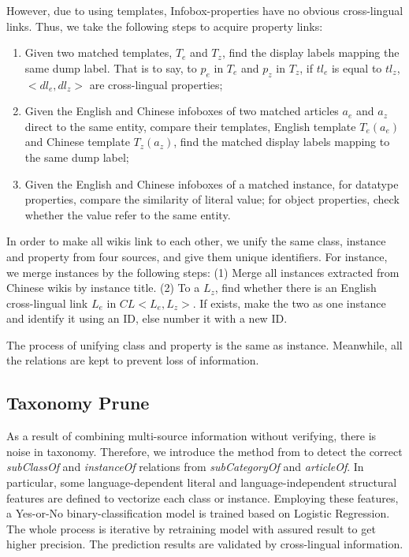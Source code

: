 \documentclass[runningheads,a4paper]{llncs}
\begin{document}
However, due to using templates, Infobox-properties have no obvious cross-lingual links. Thus, we take the following steps to acquire property links:
\begin{enumerate}
    \item Given two matched templates, $T_{e}$ and $T_{z}$, find the display labels mapping the same dump label. That is to say, to $p_{e}$ in $T_{e}$ and $p_{z}$ in $T_{z}$, if $tl_{e}$ is equal to $tl_{z}$, $<dl_{e},dl_{z}>$ are cross-lingual properties;
    \item Given the English and Chinese infoboxes of two matched articles $a_{e}$ and $a_{z}$ direct to the same entity, compare their templates, English template $T_{e}(a_{e})$ and Chinese template $T_{z}(a_{z})$, find the matched display labels mapping to the same dump label;
    \item Given the English and Chinese infoboxes of a matched instance, for datatype properties, compare the similarity of literal value; for object properties, check whether the value refer to the same entity.
\end{enumerate}

In order to make all wikis link to each other, we unify the same class, instance and property from four sources, and give them unique identifiers. For instance, we merge instances by the following steps: (1) Merge all instances extracted from Chinese wikis by instance title. (2) To a $L_{z}$, find whether there is an English cross-lingual link $L_{e}$ in $CL<L_{e}, L_{z}>$. If exists, make the two as one instance and identify it using an ID, else number it with a new ID.

The process of unifying class and property is the same as instance. Meanwhile, all the relations are kept to prevent loss of information.

\subsection{Taxonomy Prune}

As a result of combining multi-source information without verifying, there is noise in taxonomy. %
Therefore, we introduce the method from \cite{wang2014cross} to detect the correct \textit{subClassOf} and \textit{instanceOf} relations from \textit{subCategoryOf} and \textit{articleOf}. %
In particular, some language-dependent literal and language-independent structural features are defined to vectorize each class or instance. Employing these features, a Yes-or-No binary-classification model is trained based on Logistic Regression. The whole process is iterative by retraining model with assured result to get higher precision. The prediction results are validated by cross-lingual information.
\end{document}
